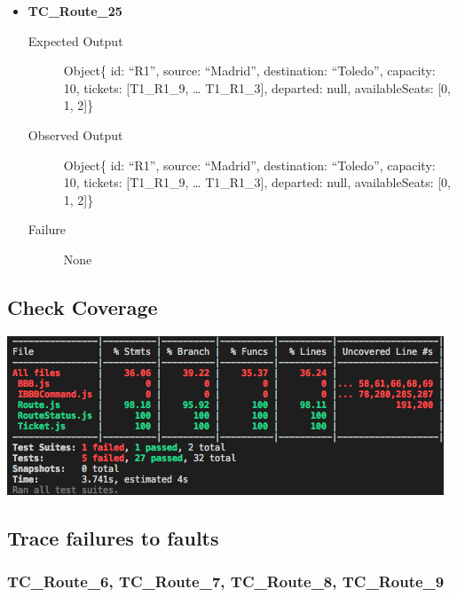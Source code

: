 \documentclass[11pt]{article}
\begin{document}
\begin{itemize}
\item \textbf{TC\_Route\_25}
\begin{description}
\item[{Expected Output}] Object\{ id: “R1”, source: “Madrid”, destination: “Toledo”, capacity: 10,  tickets: [T1\_R1\_9, … T1\_R1\_3], departed: null, availableSeats: [0, 1, 2]\}
\item[{Observed Output}] Object\{ id: “R1”, source: “Madrid”, destination: “Toledo”, capacity: 10,  tickets: [T1\_R1\_9, … T1\_R1\_3], departed: null, availableSeats: [0, 1, 2]\}
\item[{Failure}] None
\end{description}
\end{itemize}

\subsection{Check Coverage}
\label{sec:orgeac0be9}

\begin{center}
\includegraphics[width=.9\linewidth]{./Iteration2.rtfd/Pasted Graphic 1.tiff.png}
\end{center}

\subsection{Trace failures to faults}
\label{sec:orgbfb647d}

\subsubsection{TC\_Route\_6, TC\_Route\_7, TC\_Route\_8, TC\_Route\_9}
\label{sec:org62c1464}
\end{document}

